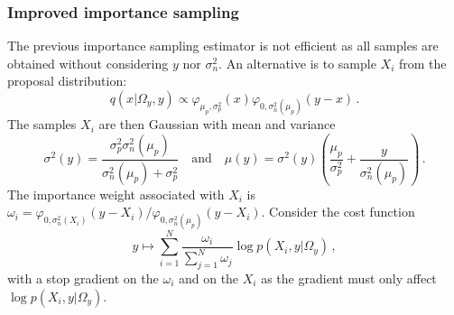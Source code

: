 \documentclass[review]{cvpr}
\begin{document}
\subsubsection{Improved importance sampling}
The previous importance sampling estimator is not efficient as all samples are obtained without considering $y$ nor $\sigma_n^2$. An alternative is to sample $X_i$ from the proposal distribution:
$$
q(x|\Omega_y,y)\propto \varphi_{\mu_p,\sigma_p^2}(x)   \varphi_{0,\sigma_n^2(\mu_p)}(y-x)\,.
$$
The samples $X_i$ are then Gaussian with mean and variance
$$
\sigma^2(y) = \frac{\sigma_p^2\sigma_n^2(\mu_p)}{\sigma_n^2(\mu_p)+\sigma_p^2} \quad\mbox{and}\quad \mu(y) = \sigma^2(y)\left(\frac{\mu_p}{\sigma_p^2} + \frac{y}{\sigma_n^2(\mu_p)}\right)\,.$$
The importance weight associated with $X_i$ is $\omega_i = \varphi_{0,\sigma_n^2(X_i)}(y-X_i)/\varphi_{0,\sigma_n^2(\mu_p)}(y-X_i)$. Consider the cost function
$$
y \mapsto \sum_{i=1}^N\frac{\omega_i}{\sum_{j=1}^N\omega_j}  \log p(X_i,y|\Omega_y)\,,
$$
with a stop gradient on the $\omega_i$ and on the $X_i$ as the gradient must only affect $ \log p(X_i,y|\Omega_y)$.

\end{document}

